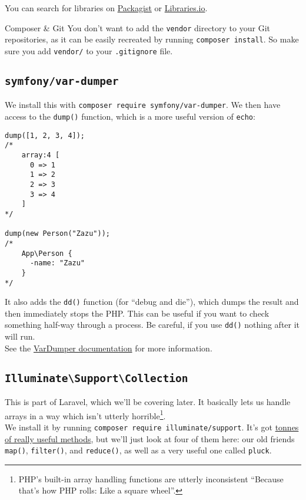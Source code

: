 You can search for libraries on \href{https://packagist.org}{Packagist} or \href{https://libraries.io/search?languages=PHP}{Libraries.io}.


\begin{infobox}{Composer \& Git}
    You don't want to add the \texttt{vendor} directory to your Git repositories, as it can be easily recreated by running \texttt{composer install}. So make sure you add \texttt{vendor/} to your \texttt{.gitignore} file.
\end{infobox}


\subsection{\texttt{symfony/var-dumper}}

We install this with \texttt{composer require symfony/var-dumper}. We then have access to the \texttt{dump()} function, which is a more useful version of \texttt{echo}:

\begin{verbatim}
dump([1, 2, 3, 4]);
/*
    array:4 [
      0 => 1
      1 => 2
      2 => 3
      3 => 4
    ]
*/

dump(new Person("Zazu"));
/*
    App\Person {
      -name: "Zazu"
    }
*/
\end{verbatim}

It also adds the \texttt{dd()} function (for ``debug and die''), which dumps the result and then immediately stops the PHP. This can be useful if you want to check something half-way through a process. Be careful, if you use \texttt{dd()} nothing after it will run.
\\

See the \href{https://symfony.com/doc/current/components/var_dumper.html}{VarDumper documentation} for more information.


\subsection{\texttt{Illuminate\textbackslash Support\textbackslash Collection}}

This is part of Laravel, which we'll be covering later. It basically lets us handle arrays in a way which isn't utterly horrible\footnote{PHP's built-in array handling functions are utterly inconsistent ``Because that's how PHP rolls: Like a square wheel''.}.
\\

We install it by running \texttt{composer require illuminate/support}. It's got \href{http://laravel.com/docs/master/collections#available-methods}{tonnes of really useful methods}, but we'll just look at four of them here: our old friends \texttt{map()}, \texttt{filter()}, and \texttt{reduce()}, as well as a very useful one called \texttt{pluck}.
\\

